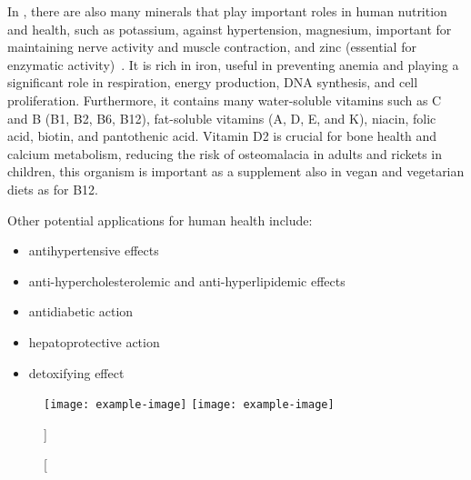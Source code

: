 In , there are also many minerals that play important roles in human nutrition and health, such as potassium, against hypertension, magnesium, important for maintaining nerve activity and muscle contraction, and zinc (essential for enzymatic activity)~\parencite{safi_Morphology_2014}\zariv{}. It is rich in iron, useful in preventing anemia and playing a significant role in respiration, energy production, DNA synthesis, and cell proliferation. Furthermore, it contains many water-soluble vitamins such as C and B (B1, B2, B6, B12), fat-soluble vitamins (A, D, E, and K), niacin, folic acid, biotin, and pantothenic acid. Vitamin D2 is crucial for bone health and calcium metabolism, reducing the risk of osteomalacia in adults and rickets in children, this organism is important as a supplement also in vegan and vegetarian diets as for B12.

Other potential applications for human health include:
\begin{itemize}
\item antihypertensive effects
\item anti-hypercholesterolemic and anti-hyperlipidemic effects
\item antidiabetic action
\item hepatoprotective action
\item detoxifying effect~\parencite{bito_Potential_2020}
\end{itemize}

\begin{figure}[H]
\centering
		{\texttt{[image: example-image]}}%
\hfill
		{\texttt{[image: example-image]}}%
\caption%
[]%
{}
\label{fig:a}
\end{figure}

